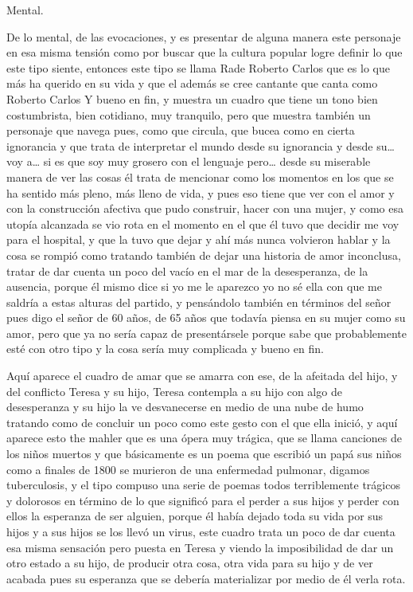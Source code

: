 Mental.

De lo mental, de las evocaciones, y es presentar de alguna manera este personaje en esa misma tensión como por buscar que la cultura popular logre definir lo que este tipo siente, entonces este tipo se llama Rade Roberto Carlos que es lo que más ha querido en su vida y que el además se cree cantante que canta como Roberto Carlos Y bueno en fin, y muestra un cuadro que tiene un tono bien costumbrista, bien cotidiano, muy tranquilo, pero que muestra también un personaje que navega pues, como que circula, que bucea como en cierta ignorancia y  que trata de interpretar el mundo desde su ignorancia y desde su… voy a… si es que soy muy grosero con el lenguaje pero… desde su miserable manera de ver las cosas él trata de mencionar como los momentos en los que se ha sentido más pleno, más lleno de vida, y pues eso tiene que ver con el amor y con la construcción afectiva que pudo construir, hacer con una mujer, y como esa utopía alcanzada se vio rota en el momento en el que él tuvo que decidir me voy para el hospital, y que la tuvo que dejar y ahí más nunca volvieron hablar y la cosa se rompió como tratando también de dejar una historia de amor inconclusa, tratar de dar cuenta un poco del vacío en el mar de la desesperanza, de la ausencia, porque él mismo dice si yo me le aparezco yo no sé ella con que me saldría a estas alturas del partido, y pensándolo también en términos del señor pues digo el señor de 60 años, de 65 años que todavía piensa en su mujer como su amor, pero que ya no sería capaz de presentársele porque sabe que probablemente esté con otro tipo y la cosa sería muy complicada y bueno en fin.

Aquí aparece el cuadro de amar que se amarra con ese, de la afeitada del hijo, y del conflicto Teresa y su hijo, Teresa contempla a su hijo con algo de desesperanza y su hijo la ve desvanecerse en medio de una nube de humo tratando como de concluir un poco como este gesto con el que ella inició, y aquí aparece esto the mahler que es una ópera muy trágica, que se llama canciones de los niños muertos y que básicamente es un poema que escribió un papá sus niños como a finales de 1800 se murieron de una enfermedad pulmonar, digamos tuberculosis, y el tipo compuso una serie de poemas todos terriblemente trágicos y dolorosos en término de lo que significó para el perder a sus hijos y perder con ellos la esperanza de ser alguien, porque él había dejado toda su vida por sus hijos y a sus hijos se los llevó un virus, este cuadro trata un poco de dar cuenta esa misma sensación pero puesta en Teresa y viendo la imposibilidad de dar un otro estado a su hijo, de producir otra cosa, otra vida para su hijo y de ver acabada pues su esperanza que se debería materializar por medio de él verla rota.

